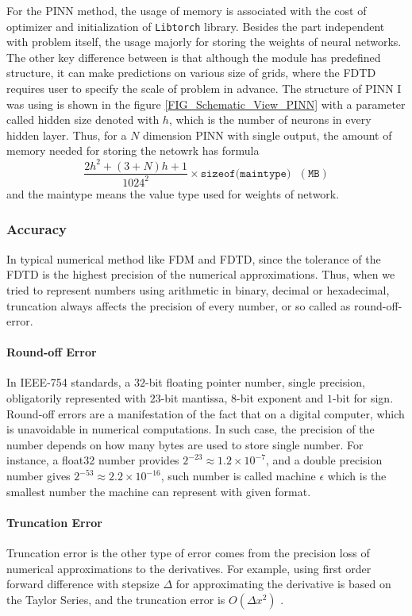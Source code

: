 For the PINN method, the usage of memory is associated with the cost of optimizer and initialization of \texttt{Libtorch} library.
Besides the part independent with problem itself, the usage majorly for storing the weights of neural networks.
The other key difference between is that although the module has predefined structure, it can make predictions on various size of grids,
where the FDTD requires user to specify the scale of problem in advance.
The structure of PINN I was using is shown in the figure 
\ref{FIG_Schematic_View_PINN} with a parameter called hidden size denoted with $h$, which is the 
number of neurons in every hidden layer.
Thus, for a $N$ dimension PINN with single output, the amount of memory needed for storing the netowrk 
has formula 
\begin{equation}
  \frac{ 2h^2 + (3 + N)h + 1 }{1024^2}\times \texttt{sizeof(maintype)} \:\:\: (\texttt{MB})
\end{equation}
and the maintype means the value type used for weights of network.

\subsubsection{Accuracy}
In typical numerical method like FDM and FDTD, since the tolerance of the FDTD is the highest precision of the numerical approximations.
Thus, when we tried to represent numbers using arithmetic in binary, decimal or hexadecimal, truncation always affects the precision of every number, 
or so called as round-off-error.

\paragraph{Round-off Error}
In IEEE-754 \cite{IEEE_754} standards, a $32$-bit floating pointer number, single precision, obligatorily represented with $23$-bit mantissa, 
$8$-bit exponent and $1$-bit for sign. 
Round-off errors are a manifestation of the fact that on a digital computer, which is unavoidable in numerical computations.
In such case, the precision of the number depends on how many bytes are used to store single number. 
For instance, a float32 number provides $2^{-23} \approx 1.2\times10^{-7}$, and a double precision number gives $2^{-53} \approx 2.2\times10^{-16}$, 
such number is called machine $\epsilon$ which is the smallest number the machine can represent with given format.

\paragraph{Truncation Error}
Truncation error is the other type of error comes from the precision loss of numerical approximations to the derivatives.
For example, using first order forward difference with stepsize $\Delta$ for approximating the derivative is based on the Taylor Series, 
and the truncation error is $O(\Delta x^2)$ \cite{GermundNMSCV1P122}.


